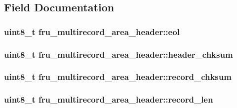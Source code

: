 \subsection{Field Documentation}
\hypertarget{structfru__multirecord__area__header_a5fd25613572ea7f09b06b004601a6f8e}{
\subsubsection[{eol}]{\setlength{\rightskip}{0pt plus 5cm}uint8\-\_\-t fru\-\_\-multirecord\-\_\-area\-\_\-header\-::eol}}\label{structfru__multirecord__area__header_a5fd25613572ea7f09b06b004601a6f8e}
\hypertarget{structfru__multirecord__area__header_a0236aea3fbae0b675889d123f0fb4dad}{
\subsubsection[{header\-\_\-chksum}]{\setlength{\rightskip}{0pt plus 5cm}uint8\-\_\-t fru\-\_\-multirecord\-\_\-area\-\_\-header\-::header\-\_\-chksum}}\label{structfru__multirecord__area__header_a0236aea3fbae0b675889d123f0fb4dad}
\hypertarget{structfru__multirecord__area__header_a1acac8573c1ac44c857f99e9b17ef548}{
\subsubsection[{record\-\_\-chksum}]{\setlength{\rightskip}{0pt plus 5cm}uint8\-\_\-t fru\-\_\-multirecord\-\_\-area\-\_\-header\-::record\-\_\-chksum}}\label{structfru__multirecord__area__header_a1acac8573c1ac44c857f99e9b17ef548}
\hypertarget{structfru__multirecord__area__header_a88b33af5e5527c19733ce245bea0b13a}{
\subsubsection[{record\-\_\-len}]{\setlength{\rightskip}{0pt plus 5cm}uint8\-\_\-t fru\-\_\-multirecord\-\_\-area\-\_\-header\-::record\-\_\-len}}\label{structfru__multirecord__area__header_a88b33af5e5527c19733ce245bea0b13a}
